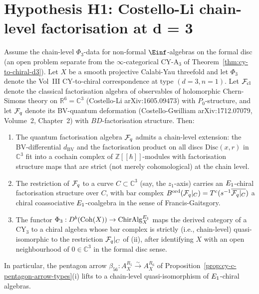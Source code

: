 \section{Hypothesis H1: Costello-Li chain-level factorisation at d = 3}
\label{sec:h1-costello-li-chain-level}

\begin{theorem}[Costello-Li chain-level factorisation at \texorpdfstring{$d = 3$}{d = 3}, compatible with \texorpdfstring{$\Phi_3$}{Phi-3}]
\label{thm:h1-costello-li-chain-level-factorisation}
Assume the chain-level $\Phi_3$-data for non-formal $\Einf$-algebras on the
formal disc (an open problem separate from the $\infty$-categorical CY-A$_3$
of Theorem~\ref{thm:cy-to-chiral-d3}). Let $X$ be a smooth projective
Calabi-Yau threefold and let $\Phi_3$ denote the Vol~III CY-to-chiral
correspondence at type $(d = 3, n = 1)$. Let $\mathcal{F}_{\mathrm{cl}}$ denote
the classical factorisation algebra of observables of holomorphic
Chern-Simons theory on $\mathbb{R}^6 = \mathbb{C}^3$ (Costello-Li
arXiv:1605.09473) with $P_0$-structure, and let $\mathcal{F}_{q}$ denote its BV-quantum
deformation (Costello-Gwilliam arXiv:1712.07079, Volume~2, Chapter~2) with
$BD$-factorisation structure. Then:
\begin{enumerate}[label=\textup{(\roman*)}]
 \item The quantum factorisation algebra $\mathcal{F}_{q}$ admits a chain-level
 extension: the BV-differential $d_{\mathrm{BV}}$ and the factorisation
 product on all discs $\mathrm{Disc}(x, r)$ in $\mathbb{C}^3$ fit into a
 cochain complex of $\mathbb{Z}[[\hbar]]$-modules with factorisation
 structure maps that are strict (not merely cohomological) at the chain
 level.
 \item The restriction of $\mathcal{F}_{q}$ to a curve $C \subset \mathbb{C}^3$ (say,
 the $z_1$-axis) carries an $E_{1}$-chiral factorisation structure over
 $C$, with bar complex
 $B^{\mathrm{ord}}(\mathcal{F}_{q}|_C) = T^c(s^{-1} \overline{\mathcal{F}_{q}|_C})$ a chiral
 coassociative $E_{1}$-coalgebra in the sense of
 Francis-Gaitsgory.
 \item The functor $\Phi_3: D^b(\mathrm{Coh}(X)) \to \mathrm{ChirAlg}^{E_{1}}_X$ maps
 the derived category of a CY$_3$ to a chiral algebra whose bar complex
 is strictly (i.e., chain-level) quasi-isomorphic to the restriction
 $\mathcal{F}_{q}|_C$ of (ii), after identifying $X$ with an open neighbourhood
 of $0 \in \mathbb{C}^3$ in the formal disc sense.
\end{enumerate}
In particular, the pentagon arrow
$\beta_{56}: A_X^{R_5} \xrightarrow{\sim} A_X^{R_6}$ of
Proposition~\ref{prop:cy-c-pentagon-arrow-types}(i) lifts to a chain-level
quasi-isomorphism of $E_{1}$-chiral algebras.
\end{theorem}

